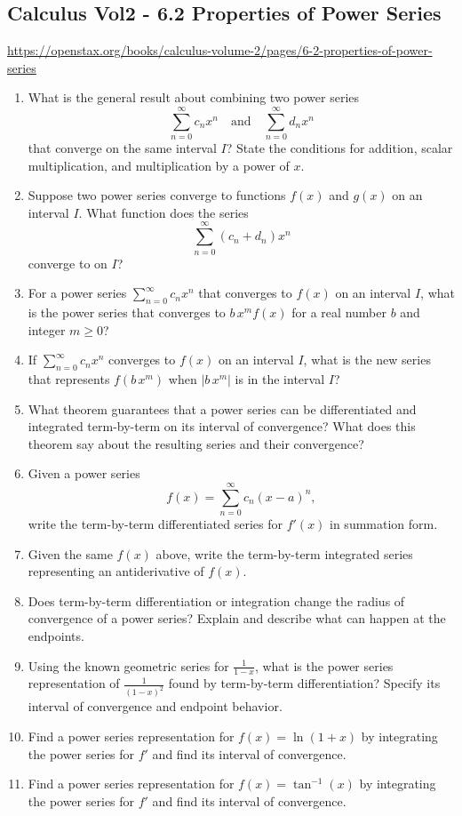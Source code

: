 \subsection{Calculus Vol2 - 6.2 Properties of Power Series}

\url{https://openstax.org/books/calculus-volume-2/pages/6-2-properties-of-power-series}

\begin{enumerate}
  \item What is the general result about combining two power series
    \[
      \sum_{n=0}^{\infty}c_nx^n\quad\text{and}\quad\sum_{n=0}^{\infty}d_nx^n
    \]
    that converge on the same interval \(I\)? State the conditions for addition, scalar multiplication, and multiplication by a power of \(x\).
  \item Suppose two power series converge to functions \(f(x)\) and \(g(x)\) on an interval \(I\). What function does the series
    \[
      \sum_{n=0}^{\infty}(c_n+d_n)x^n
    \]
    converge to on \(I\)?
  \item For a power series \(\sum_{n=0}^{\infty}c_nx^n\) that converges to \(f(x)\) on an interval \(I\), what is the power series that converges to \(b\,x^m f(x)\) for a real number \(b\) and integer \(m\ge0\)?
  \item If \(\sum_{n=0}^{\infty}c_nx^n\) converges to \(f(x)\) on an interval \(I\), what is the new series that represents \(f(b\,x^m)\) when \(|b\,x^m|\) is in the interval \(I\)?
  \item What theorem guarantees that a power series can be differentiated and integrated term-by-term on its interval of convergence? What does this theorem say about the resulting series and their convergence?
  \item Given a power series
    \[
      f(x)=\sum_{n=0}^{\infty}c_n(x-a)^n,
    \]
    write the term-by-term differentiated series for \(f'(x)\) in summation form.
  \item Given the same \(f(x)\) above, write the term-by-term integrated series representing an antiderivative of \(f(x)\).
  \item Does term-by-term differentiation or integration change the radius of convergence of a power series? Explain and describe what can happen at the endpoints.
  \item Using the known geometric series for \(\frac{1}{1-x}\), what is the power series representation of \(\frac{1}{(1-x)^2}\) found by term-by-term differentiation? Specify its interval of convergence and endpoint behavior.
  \item Find a power series representation for \(f(x)=\ln(1+x)\) by integrating the power series for $f'$ and find its interval of convergence.
  \item Find a power series representation for \(f(x)=\tan^{-1}(x)\) by integrating the power series for $f'$ and find its interval of convergence.
\end{enumerate}
